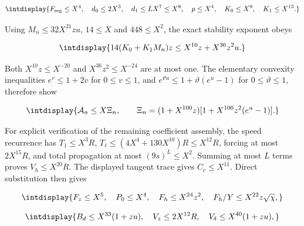 \begingroup\renewcommand{\theHequation}{intdisplay.540}
\begin{equation*}
\intdisplay{
F_{\rm seg}\le X^4,\quad d_0\le2X^3,\quad
d_1\le LX^7\le X^8,\quad p\le X^4,
\quad K_0\le X^9,\quad K_1\le X^{13}.
}
\end{equation*}
\endgroup


Using \(M_n\le32X^{21}zu\), \(14\le X\) and \(448\le X^2\), the exact stability exponent obeys


\begingroup\renewcommand{\theHequation}{intdisplay.541}
\begin{equation}
\intdisplay{
14(K_0+K_1M_n)z\le X^{10}z+X^{36}z^2u.
}
\label{int:eq-0228-legendre-simple-exponent}
\end{equation}
\endgroup


Both \(X^{10}z\le X^{-20}\) and \(X^{36}z^2\le X^{-24}\) are at most one. The elementary convexity inequalities \(e^v\le1+2v\) for \(0\le v\le1\), and \(e^{\vartheta u}\le1+\vartheta(e^u-1)\) for \(0\le\vartheta\le1\), therefore show


\begingroup\renewcommand{\theHequation}{intdisplay.542}
\begin{equation}
\intdisplay{
\mathcal A_n\le X\Xi_n,\qquad
\Xi_n=(1+X^{100}z)[1+X^{100}z^2(e^u-1)].
}
\label{int:eq-0229-legendre-exponential-interpolation}
\end{equation}
\endgroup


For explicit verification of the remaining coefficient assembly, the speed recurrence has \(T_1\le X^3R\), \(T_\ell\le(4X^4+130X^{10})R\le X^{12}R\), forcing at most \(2X^{15}R\), and total propagation at most \((9s)^L\le X^2\). Summing at most \(L\) terms proves \(V_h\le X^{20}R\). The displayed tangent trace gives \(C_c\le X^{11}\). Direct substitution then gives


\begingroup\renewcommand{\theHequation}{intdisplay.543}
\begin{equation*}
\intdisplay{
F_z\le X^5,\quad P_0\le X^4,\quad
F_h\le X^{24}z^2,\quad F_h/Y\le X^{22}z\sqrt\chi,
}
\end{equation*}
\endgroup

\begingroup\renewcommand{\theHequation}{intdisplay.544}
\begin{equation*}
\intdisplay{
B_d\le X^{33}(1+zu),\quad
V_z\le2X^{12}R,\quad V_\delta\le X^{40}(1+zu),
}
\end{equation*}
\endgroup

